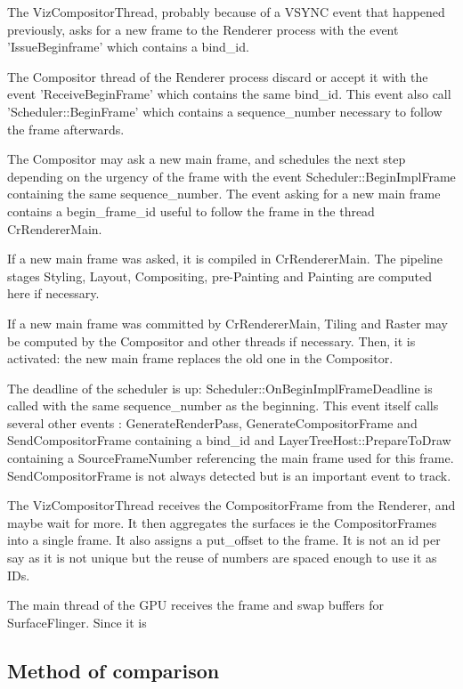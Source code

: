 \item The VizCompositorThread, probably because of a VSYNC event that happened previously, asks for a new frame to the Renderer process with the event 'IssueBeginframe' which contains a bind\_id.
    \item The Compositor thread of the Renderer process discard or accept it with the event 'ReceiveBeginFrame' which contains the same bind\_id. This event also call 'Scheduler::BeginFrame' which contains a sequence\_number necessary to follow the frame afterwards.
    \item The Compositor may ask a new main frame, and schedules the next step depending on the urgency of the frame with the event Scheduler::BeginImplFrame containing the same sequence\_number. The event asking for a new main frame contains a begin\_frame\_id useful to follow the frame in the thread CrRendererMain.
    \item If a new main frame was asked, it is compiled in CrRendererMain. The pipeline stages Styling, Layout, Compositing, pre-Painting and Painting are computed here if necessary.
    \item If a new main frame was committed by CrRendererMain, Tiling and Raster may be computed by the Compositor and other threads if necessary. Then, it is activated: the new main frame replaces the old one in the Compositor.
    \item The deadline of the scheduler is up: Scheduler::OnBeginImplFrameDeadline is called with the same sequence\_number as the beginning. This event itself calls several other events : GenerateRenderPass, GenerateCompositorFrame and SendCompositorFrame containing a bind\_id and LayerTreeHost::PrepareToDraw containing a SourceFrameNumber referencing the main frame used for this frame. SendCompositorFrame is not always detected but is an important event to track.
    \item The VizCompositorThread receives the CompositorFrame from the Renderer, and maybe wait for more. It then aggregates the surfaces ie the CompositorFrames into a single frame. It also assigns a put\_offset to the frame. It is not an id per say as it is not unique but the reuse of numbers are spaced enough to use it as IDs.
    \item The main thread of the GPU receives the frame and swap buffers for SurfaceFlinger. Since it is 
    
    \subsection{Method of comparison}
    
